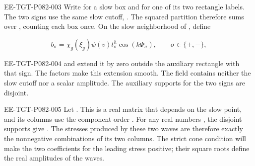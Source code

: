 \begin{EESegment}{EE-TGT-P082-003}
Write  for a slow box and  for one of its two rectangle labels. The two signs use the same slow cutoff, . The squared partition therefore sums over , counting each box once. On the slow neighborhood of , define
\end{EESegment}
\[
  b_\sigma=\chi_g(\xi_g)\psi(v)t^h_\sigma\cos(k\Phi_\sigma),
  \qquad \sigma\in\{+,-\},
\]
\begin{EESegment}{EE-TGT-P082-004}
and extend it by zero outside the auxiliary rectangle with that sign. The factors  make this extension smooth. The field  contains neither the slow cutoff  nor a scalar amplitude. The auxiliary supports for the two signs are disjoint.
\end{EESegment}

\begin{EESegment}{EE-TGT-P082-005}
Let . This is a real  matrix that depends on the slow point, and its columns use the component order . For any real numbers , the disjoint supports give . The stresses produced by these two waves are therefore exactly the nonnegative combinations of its two columns. The strict cone condition will make the two coefficients for the leading stress positive; their square roots define the real amplitudes of the waves.
\end{EESegment}


